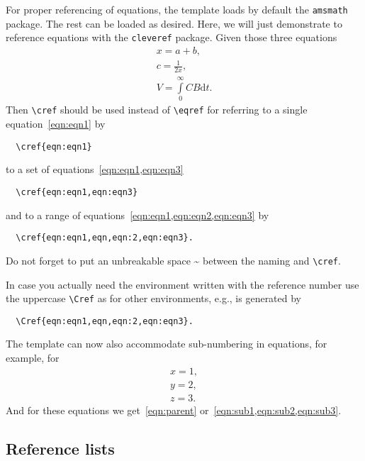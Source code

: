 \documentclass[%
  a4paper,
  twocolumn,
  colorlinks,
]{preprint}
\begin{document}
For proper referencing of equations, the template loads by default the
\verb|amsmath| package.
The rest can be loaded as desired.
Here, we will just demonstrate to reference equations with the \verb|cleveref|
package.
Given those three equations
\begin{align}
  \label{eqn:eqn1}
  x = a + b,\\
  \label{eqn:eqn2}
  c = \frac{1}{2 x},\\
  \label{eqn:eqn3}
  V = \int\limits_{0}^{\infty} CB \mathrm{d}t.
\end{align}
Then \verb|\cref| should be used instead of \verb|\eqref| for referring to
a single equation~\cref{eqn:eqn1} by
\begin{verbatim}
  \cref{eqn:eqn1}
\end{verbatim}
to a set of equations~\cref{eqn:eqn1,eqn:eqn3}
\begin{verbatim}
  \cref{eqn:eqn1,eqn:eqn3}
\end{verbatim}
and to a range of equations~\cref{eqn:eqn1,eqn:eqn2,eqn:eqn3} by
\begin{verbatim}
  \cref{eqn:eqn1,eqn,eqn:2,eqn:eqn3}.
\end{verbatim}
Do not forget to put an unbreakable space \~{} between the naming and
\verb|\cref|.

In case you actually need the environment written with the reference number
use the uppercase \verb|\Cref| as for other environments, e.g.,
 is generated by
\begin{verbatim}
  \Cref{eqn:eqn1,eqn,eqn:2,eqn:eqn3}.
\end{verbatim}
The template can now also accommodate sub-numbering in equations, for example,
for
\begin{subequations} \label{eqn:parent}
\begin{align}
  \label{eqn:sub1}
  x = 1, \\
  \label{eqn:sub2}
  y = 2, \\
  \label{eqn:sub3}
  z = 3.
\end{align}
\end{subequations}
And for these equations we get~\cref{eqn:parent}
or~\cref{eqn:sub1,eqn:sub2,eqn:sub3}.


\subsection{Reference lists}%
\label{subsec:ref}
\end{document}
